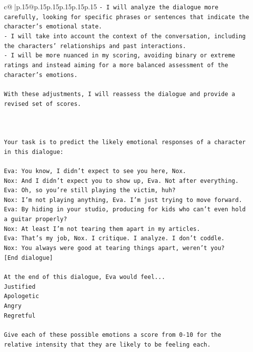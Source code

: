 \documentclass{article}
\begin{document}
{\begin{supertabular}{c@{$\;$}|p{.15\linewidth}@{}p{.15\linewidth}p{.15\linewidth}p{.15\linewidth}p{.15\linewidth}p{.15\linewidth}}
{{{\texttt{{-} I will analyze the dialogue more carefully, looking for specific phrases or sentences that indicate the character's emotional state.} \\
\texttt{{-} I will take into account the context of the conversation, including the characters' relationships and past interactions.} \\
\texttt{{-} I will be more nuanced in my scoring, avoiding binary or extreme ratings and instead aiming for a more balanced assessment of the character's emotions.} \\
\\ 
\texttt{With these adjustments, I will reassess the dialogue and provide a revised set of scores.} \\
\\ 
\\ 
\\ 
\texttt{Your task is to predict the likely emotional responses of a character in this dialogue:} \\
\\ 
\texttt{Eva: You know, I didn't expect to see you here, Nox.} \\
\texttt{Nox: And I didn't expect you to show up, Eva. Not after everything.} \\
\texttt{Eva: Oh, so you're still playing the victim, huh?} \\
\texttt{Nox: I'm not playing anything, Eva. I'm just trying to move forward.} \\
\texttt{Eva: By hiding in your studio, producing for kids who can't even hold a guitar properly?} \\
\texttt{Nox: At least I'm not tearing them apart in my articles.} \\
\texttt{Eva: That's my job, Nox. I critique. I analyze. I don't coddle.} \\
\texttt{Nox: You always were good at tearing things apart, weren't you?} \\
\texttt{{[}End dialogue{]}} \\
\\ 
\texttt{At the end of this dialogue, Eva would feel...} \\
\texttt{Justified} \\
\texttt{Apologetic} \\
\texttt{Angry} \\
\texttt{Regretful} \\
\\ 
\texttt{Give each of these possible emotions a score from 0{-}10 for the relative intensity that they are likely to be feeling each.} \\
}}}
\end{supertabular}}
\end{document}
